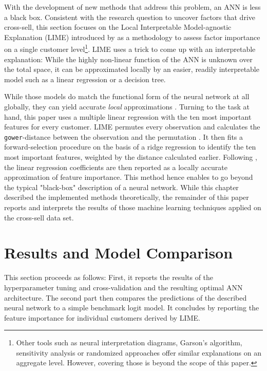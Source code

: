 \documentclass[12pt,a4paper]{article}
\let\code=\texttt
\begin{document}
With the development of new methods that address this problem, an ANN is less a black box.
Consistent with the research question to uncover factors that drive cross-sell, 
this section focuses on the Local Interpretable Model-agnostic Explanation (LIME) introduced by \cite{ribeiroWhyShouldTrust2016a} as a methodology
to assess factor importance on a single customer level\footnote{Other tools such as neural interpretation diagrams, Garson's algorithm, sensitivity analysis or randomized approaches
\citep{oldenIlluminatingBlackBox2002} offer similar explanations on an aggregate level. However, covering those is beyond the scope of this paper.}.
LIME uses a trick to come up with an interpretable explanation: While the highly non-linear function of the ANN is unknown over the total space,
it can be approximated locally by an easier, readily interpretable model such as a linear regression or a decision tree.

While those models do match the functional form of the neural network at all globally, they can yield accurate \textit{local} approximations
\citep[see figure 3 for a visual example]{ribeiroWhyShouldTrust2016a}.
Turning to the task at hand, this paper uses a multiple linear regression with the ten most important features for every customer.
LIME permutes every observation and calculates the \code{gower}-distance between the observation and the permutation \citep{pedersenUnderstandingLime2018}.
It then fits a forward-selection procedure on the basis of a ridge regression \citep{pedersenPackageLimeLocal2018} to identify the ten most 
important features, weighted by the distance calculated earlier.
Following \cite{ribeiroWhyShouldTrust2016a}, the linear regression coefficients are then reported as a locally accurate approximation of feature importance.
This method hence enables to go beyond the typical "black-box" description of a neural network.
While this chapter described the implemented methods theoretically, the remainder of this paper reports and interprets the results of those 
machine learning techniques applied on the cross-sell data set.

\section{Results and Model Comparison}
This section proceeds as follows: First, it reports the results of the hyperparameter tuning and cross-validation and the resulting optimal ANN architecture.
The second part then compares the predictions of the described neural network to a simple benchmark logit model.
It concludes by reporting the feature importance for individual customers derived by LIME.
\end{document}
